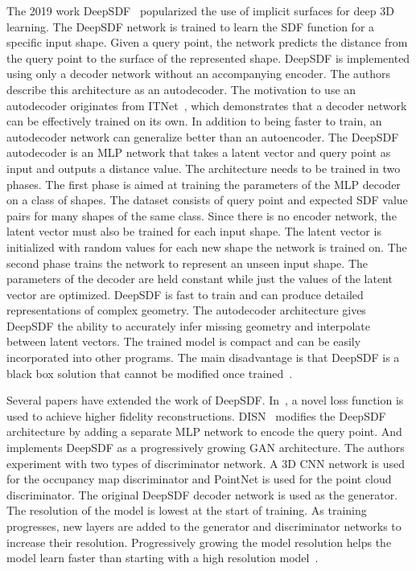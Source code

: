 The 2019 work DeepSDF~\cite{Park2019} popularized the use of implicit surfaces for deep 3D learning. The DeepSDF network is trained to learn the SDF function for a specific input shape. Given a query point, the network predicts the distance from the query point to the surface of the represented shape. DeepSDF is implemented using only a decoder network without an accompanying encoder. The authors describe this architecture as an autodecoder. The motivation to use an autodecoder originates from ITNet~\cite{Tan1995}, which demonstrates that a decoder network can be effectively trained on its own. In addition to being faster to train, an autodecoder network can generalize better than an autoencoder. The DeepSDF autodecoder is an MLP network that takes a latent vector and query point as input and outputs a distance value. The architecture needs to be trained in two phases. The first phase is aimed at training the parameters of the MLP decoder on a class of shapes. The dataset consists of query point and expected SDF value pairs for many shapes of the same class. Since there is no encoder network, the latent vector must also be trained for each input shape. The latent vector is initialized with random values for each new shape the network is trained on. The second phase trains the network to represent an unseen input shape. The parameters of the decoder are held constant while just the values of the latent vector are optimized. DeepSDF is fast to train and can produce detailed representations of complex geometry. The autodecoder architecture gives DeepSDF the ability to accurately infer missing geometry and interpolate between latent vectors. The trained model is compact and can be easily incorporated into other programs. The main disadvantage is that DeepSDF is a black box solution that cannot be modified once trained~\cite{Park2019}.

Several papers have extended the work of DeepSDF. In~\cite{Gropp2020}, a novel loss function is used to achieve higher fidelity reconstructions. DISN~\cite{Wang2019} modifies the DeepSDF architecture by adding a separate MLP network to encode the query point. And \cite{Kleineberg2020} implements DeepSDF as a progressively growing GAN architecture. The authors experiment with two types of discriminator network. A 3D CNN network is used for the occupancy map discriminator and PointNet is used for the point cloud discriminator. The original DeepSDF decoder network is used as the generator. The resolution of the model is lowest at the start of training. As training progresses, new layers are added to the generator and discriminator networks to increase their resolution. Progressively growing the model resolution helps the model learn faster than starting with a high resolution model~\cite{Kleineberg2020}.

